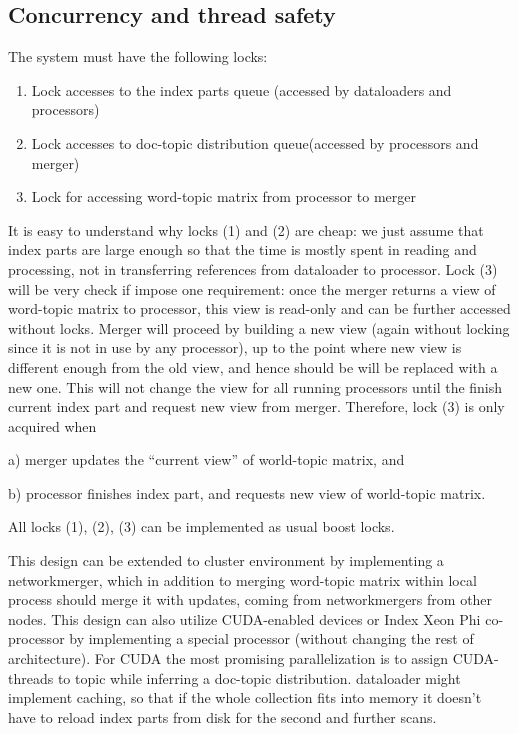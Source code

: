 \documentclass[11pt,a4paper,twoside]{report}
\begin{document}
\subsection{Concurrency and thread safety}
The system must have the following locks:
\begin{enumerate}
    \item Lock accesses to the index parts queue (accessed by dataloaders and processors)
    \item Lock accesses to doc-topic distribution queue(accessed by processors and merger)
    \item Lock for accessing word-topic matrix from processor to merger
\end{enumerate}

It is easy to understand why locks (1) and (2) are cheap:
we just assume that index parts are large enough so that the time is mostly spent in reading and processing, 
not in transferring references from dataloader to processor. 
Lock (3) will be very check if impose one requirement: 
once the merger returns a view of word-topic matrix to processor, 
this view is read-only and can be further accessed without locks.
Merger will proceed by building a new view (again without locking since it is not in use by any processor),
up to the point where new view is different enough from the old view, 
and hence should be will be replaced with a new one.
This will not change the view for all running processors 
until the finish current index part and request new view from merger. 
Therefore, lock (3) is only acquired when

a) merger updates the “current view” of world-topic matrix, and

b) processor finishes index part, and requests new view of world-topic matrix.

All locks (1), (2), (3) can be implemented as usual boost locks.

This design can be extended to cluster environment by implementing a networkmerger,
which in addition to merging word-topic matrix within local process should merge it with updates, 
coming from networkmergers from other nodes.
This design can also utilize CUDA-enabled devices or Index Xeon Phi co-processor
by implementing a special processor (without changing the rest of architecture). 
For CUDA the most promising parallelization is to assign CUDA-threads to topic 
while inferring a doc-topic distribution.
dataloader might implement caching, so that if the whole collection fits into memory 
it doesn’t have to reload index parts from disk for the second and further scans.
\end{document}
